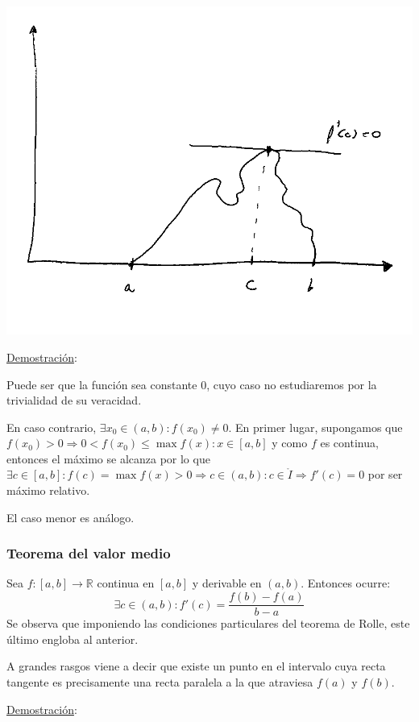 \documentclass[10pt,a4paper,openright]{book}
\begin{document}
\begin{center}
\includegraphics[scale=0.90]{Teorema de Rolle}
\end{center}

\underline{Demostración}:

Puede ser que la función sea constante 0, cuyo caso no estudiaremos por la trivialidad de su veracidad.

En caso contrario, $\exists x_0\in (a,b):f(x_0)\neq 0$. En primer lugar, supongamos que $f(x_0)>0\Rightarrow 0<f(x_0)\leq \max{f(x)}: x\in [a,b]$ y como $f$ es continua, entonces el máximo se alcanza por lo que $\exists c\in [a,b]: f(c)=\max{f(x)}>0\Rightarrow c\in (a,b): c\in \mathring{I}\Rightarrow f'(c) = 0$ por ser máximo relativo.

El caso menor es análogo.

\subsubsection*{Teorema del valor medio}
Sea $f:[a,b]\rightarrow\mathbb R$ continua en $[a,b]$ y derivable en $(a,b)$. Entonces ocurre:
$$\exists c \in (a,b): f'(c)=\frac{f(b)-f(a)}{b-a}$$
Se observa que imponiendo las condiciones particulares del teorema de Rolle, este último engloba al anterior.

A grandes rasgos viene a decir que existe un punto en el intervalo cuya recta tangente es precisamente una recta paralela a la que atraviesa $f(a)$ y $f(b)$.

\underline{Demostración}:
\end{document}
